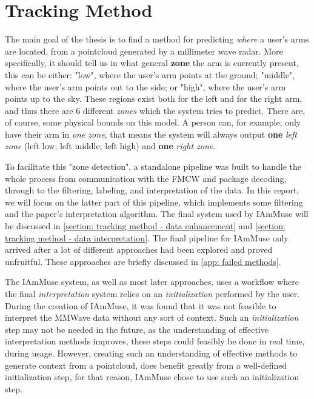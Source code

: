 \chapter{Tracking Method}
\label{chapter: tracking method}

The main goal of the thesis is to find a method for predicting \textit{where} a user's arms are located, from a pointcloud generated by a millimeter wave radar.
More specifically, it should tell us in what general \textbf{zone} the arm is currently present, this can be either: 
"low", where the user's arm points at the ground;
"middle", where the user's arm points out to the side;
or "high", where the user's arm points up to the sky.
These regions exist both for the left and for the right arm, and thus there are 6 different \textit{zones} which the system tries to predict.
There are, of course, some physical bounds on this model. 
A person can, for example, only have their arm in \textit{one zone}, that means the system will always output \textbf{one} \textit{left zone} (left low; left middle; left high) and \textbf{one} \textit{right zone}.

To facilitate this "zone detection", a standalone pipeline was built to handle the whole process from communication with the FMCW and package decoding, through to the filtering, labeling, and interpretation of the data. 
In this report, we will focus on the latter part of this pipeline, which implements some filtering and the paper's interpretation algorithm.
The final system used by IAmMuse will be discussed in \cref{section: tracking method - data enhancement}
 and \cref{section: tracking method - data interpretation}.
The final pipeline for IAmMuse only arrived after a lot of different approaches had been explored and proved unfruitful.
These approaches are briefly discussed in \cref{app: failed methods}.


The IAmMuse system, as well as most later approaches, uses a workflow where the final \textit{interpretation} system relies on an \textit{initialization} performed by the user.
During the creation of IAmMuse, it was found that it was not feasible to interpret the MMWave data without any sort of context.
Such an \textit{initialization} step may not be needed in the future, as the understanding of effective interpretation methods improves, these steps could feasibly be done in real time, during usage.
However, creating such an understanding of effective methods to generate context from a pointcloud, does benefit greatly from a well-defined initialization step, for that reason, IAmMuse chose to use such an initialization step.






